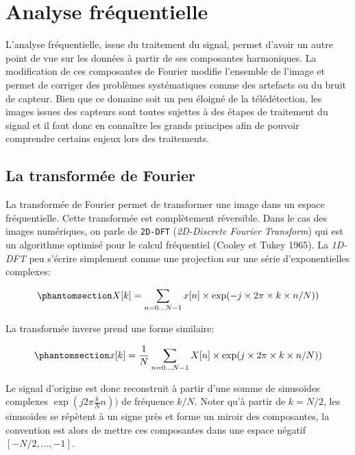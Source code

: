 \documentclass[
  11pt,
  letterpaper,
  open=any,
  twoside=false,
  french]{scrbook}
\begin{document}
\section{Analyse fréquentielle}\label{analyse-fruxe9quentielle}

L'analyse fréquentielle, issue du traitement du signal, permet d'avoir
un autre point de vue sur les données à partir de ses composantes
harmoniques. La modification de ces composantes de Fourier modifie
l'ensemble de l'image et permet de corriger des problèmes systématiques
comme des artefacts ou du bruit de capteur. Bien que ce domaine soit un
peu éloigné de la télédétection, les images issues des capteurs sont
toutes sujettes à des étapes de traitement du signal et il faut donc en
connaître les grands principes afin de pouvoir comprendre certains
enjeux lors des traitements.

\subsection{La transformée de
Fourier}\label{la-transformuxe9e-de-fourier}

La transformée de Fourier permet de transformer une image dans un espace
fréquentielle. Cette transformée est complètement réversible. Dans le
cas des images numériques, on parle de \texttt{2D-DFT}
(\emph{2D-Discrete Fourier Transform}) qui est un algorithme optimisé
pour le calcul fréquentiel (Cooley et Tukey 1965). La \emph{1D-DFT} peu
s'écrire simplement comme une projection sur une série d'exponentielles
complexes:

\begin{equation}\phantomsection\label{eq-dft}{X[k] = \sum_{n=0 \ldots N-1} x[n] \times \exp(-j \times 2\pi \times k \times n/N))}\end{equation}

La transformée inverse prend une forme similaire:

\begin{equation}\phantomsection\label{eq-idft}{x[k] = \frac{1}{N}\sum_{n=0 \ldots N-1} X[n] \times \exp(j \times 2\pi \times k \times n/N))}\end{equation}

Le signal d'origine est donc reconstruit à partir d'une somme de
sinusoïdes complexes \(\exp(j2\pi \frac{k}{N}n))\) de fréquence \(k/N\).
Noter qu'à partir de \(k=N/2\), les sinusoïdes se répètent à un signe
près et forme un miroir des composantes, la convention est alors de
mettre ces composantes dans une espace négatif \([-N/2,\ldots,-1]\).
\end{document}

